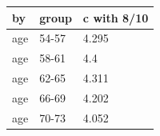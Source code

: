 \begingroup\small
\setlength{\tabcolsep}{3pt}
\renewcommand{\arraystretch}{1.04}
\begin{tabularx}{\linewidth}{XXX}
\toprule
by & group & c with 8/10 \\
\midrule
age & 54-57 & 4.295 \\
age & 58-61 & 4.4 \\
age & 62-65 & 4.311 \\
age & 66-69 & 4.202 \\
age & 70-73 & 4.052 \\
\bottomrule
\end{tabularx}
\endgroup
